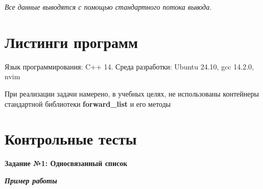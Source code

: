 \documentclass[a4paper,12pt]{article}
\begin{document}
	
	\textit{Все данные выводятся с помощью стандартного потока вывода.}	
	
	\newpage
	\section{Листинги программ}
	Язык программирования: C++ 14. Среда разработки: Ubuntu 24.10, gcc 14.2.0, nvim
	
	При реализации задачи намерено, в учебных целях, не использованы контейнеры стандартной библиотеки \textbf{forward\_list} и его методы 
	
	
	
	
	
	\newpage	
	\section{Контрольные тесты}
	
	\textbf{Задание №1: Односвязанный список}
	
	\textit{\textbf{Пример работы}}
	
\end{document}
